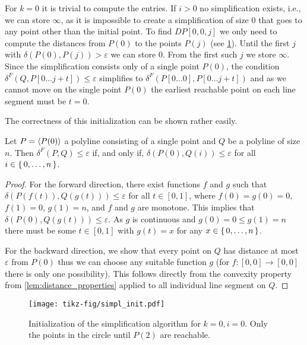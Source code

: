 For \(k = 0\) it is trivial to compute the entries. If \(i > 0\) no simplification exists, i.e., we can store \(\infty\), as it is impossible to create a simplification of size \(0\) that goes to any point other than the initial point. To find \(DP[0, 0, j]\) we only need to compute the distances from \(P(0)\) to the points \(P(j)\) (see \cref{fig:simpl_init}). Until the first \(j\) with \(\delta(P(0), P(j)) > \varepsilon\) we can store \(0\). From the first such \(j\) we store \(\infty\). Since the simplification consists only of a single point \(P(0)\), the condition \(\delta^F(Q, P[0\dots j + t]) \leq \varepsilon\) simplifies to \(\delta^F(P[0 \dots 0], P[0 \dots j + t])\) and as we cannot move on the single point \(P(0)\) the earliest reachable point on each line segment must be \(t = 0\). 

The correctness of this initialization can be shown rather easily. 
\begin{lemma}
  Let \(P = \left\langle P(0)\right\rangle\) a polyline consisting of a single point and \(Q\) be a polyline of size \(n\). Then \(\delta^F(P, Q) \leq \varepsilon\) if, and only if, \(\delta(P(0), Q(i)) \leq \varepsilon\) for all \(i \in \set{0, \dots, n}\). 
\end{lemma}
\begin{proof}
  For the forward direction, there exist functions \(f\) and \(g\) such that \(\delta(P(f(t)), Q(g(t))) \leq \varepsilon\) for all \(t\in [0,1]\), where \(f(0) = g(0) = 0\), \(f(1) = 0\), \(g(1) = n\), and \(f\) and \(g\) are  monotone. This implies that \(\delta(P(0), Q(g(t))) \leq \varepsilon\). As \(g\) is continuous and \(g(0) = 0 \leq g(1) = n\) there must be some \(t \in [0,1]\) with \(g(t) = x\) for any \(x\in \set{0, \dots, n}\).
  
  For the backward direction, we show that every point on \(Q\) has distance at most \(\varepsilon\) from \(P(0)\) thus we can choose any suitable function \(g\) (for \(f:[0,0] \to [0,0]\) there is only one possibility). This follows directly from the convexity property from \cref{lem:distance_properties} applied to all individual line segment on \(Q\).
\end{proof}

\begin{figure}[b]
  \centering
  \texttt{[image: tikz-fig/simpl\_init.pdf]}
  \caption{Initialization of the simplification algorithm for \(k = 0, i = 0\). Only the points in the circle until \(P(2)\) are reachable.}
  \label{fig:simpl_init}
\end{figure}


